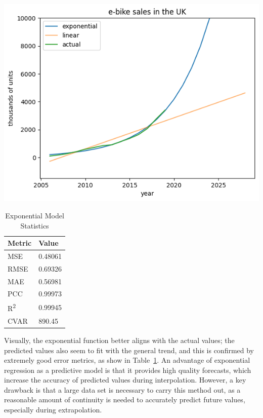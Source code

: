 \begin{table}[h]
    \begin{minipage}{0.7\linewidth}
        \centering
        \includegraphics[width=\textwidth]{exponential}%
        \label{fig:ebike_exp}
    \end{minipage}%
    \begin{minipage}{0.3\linewidth}
        \centering
        \begin{tabular}{ll}
            \toprule
            Metric               & Value   \\
            \midrule
            MSE                  & 0.48061 \\
            RMSE                 & 0.69326 \\
            MAE                  & 0.56981 \\
            PCC                  & 0.99973 \\
            R\textsuperscript{2} & 0.99945 \\
            CVAR                 & 890.45  \\
            \bottomrule
        \end{tabular}
        \vspace{8pt}
        \caption{Exponential Model Statistics}
        \label{tab:ebike_exp_err}
    \end{minipage}
\end{table}

Visually, the exponential function better aligns with the actual values; the predicted values also seem to fit with the general trend, and this is confirmed by extremely good error metrics, as show in Table~\ref{tab:ebike_exp_err}.
An advantage of exponential regression as a predictive model is that it provides high quality forecasts, which increase the accuracy of predicted values during interpolation.
However, a key drawback is that a large data set is necessary to carry this method out, as a reasonable amount of continuity is needed to accurately predict future values, especially during extrapolation.



